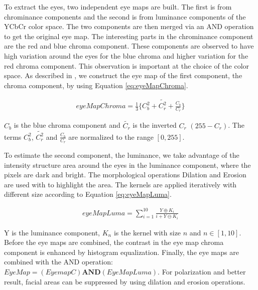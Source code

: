 


To extract the eyes, two independent eye maps are built. The first is from chrominance components and the second is from luminance components of the YCbCr color space. The two components are then merged via an AND operation to get the original eye map. The interesting parts in the chrominance component are the red and blue chroma component. These components are observed to have high variation around the eyes for the blue chroma and higher variation for the red chroma component. This observation is important at the choice of the color space. As described in \cite{fdInColorImages}, we construct the eye map of the first component, the chroma component, by using Equation \ref{eq:eyeMapChroma}.

\begin{equation} \label{eq:eyeMapChroma}
\begin{split}
eyeMapChroma = \frac{1}{3} \lbrace C_b^2 + \tilde{C_r^2} + \frac{C_b}{C_r} \rbrace
\end{split}
\end{equation}

$C_b$ is the blue chroma component and $\tilde{C_r}$ is the inverted $C_r$ $(255 - C_r)$. The terms $C_b^2$, $\tilde{C_r^2}$ and $\frac{C_b}{C_r}$ are normalized to the range $[0, 255]$.

To estimate the second component, the luminance, we take advantage of the intensity structure area around the eyes in the luminance component, where the pixels are dark and bright. The morphological operations Dilation and Erosion are used with to highlight the area. The kernels are applied iteratively with different size according to Equation \ref{eq:eyeMapLuma}.

\begin{equation} \label{eq:eyeMapLuma}
\begin{split}
  eyeMapLuma = \sum_{i=1}^{10}\frac{Y\oplus K_{i}}{i + Y\ominus  K_{i}}
\end{split}
\end{equation}

Y is the luminance component, $K_n$ is the kernel with size $n$ and $ n \in [1,10]$. Before the eye maps are combined, the contrast in the eye map chroma component is enhanced by histogram equalization. Finally, the eye maps are combined with the AND operation: $EyeMap = (EyemapC) \textbf{AND} (EyeMapLuma)$. For polarization and better result, facial areas can be suppressed by using dilation and erosion operations. 







